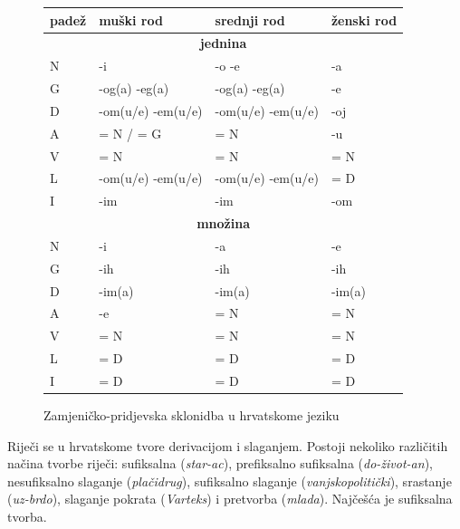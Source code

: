 \begin{multicols}{2}
\begin{figure}[htb]
\centering
    \begin{tabular}{|l|l|l|l|}
        \hline
        \textbf{padež} & \textbf{muški rod}         & \textbf{srednji rod}        & \textbf{ženski rod} \\ \hline
		\multicolumn{4}{|c|}{\textbf{jednina}} \\ \hline
        N     & -i                & -o -e             & -a          \\ 
        G     & -og(a) -eg(a)     & -og(a) -eg(a)     & -e          \\ 
        D     & -om(u/e) -em(u/e) & -om(u/e) -em(u/e) & -oj         \\ 
        A     & = N / = G         & = N               & -u          \\ 
        V     & = N               & = N               & = N         \\ 
        L     & -om(u/e) -em(u/e) & -om(u/e) -em(u/e) & = D         \\ 
        I     & -im               & -im               & -om         \\ \hline
		\multicolumn{4}{|c|}{\textbf{množina}} \\ \hline
		N     & -i        & -a         & -e          \\ 
        G     & -ih       & -ih        & -ih         \\ 
        D     & -im(a)    & -im(a)     & -im(a)      \\ 
        A     & -e        & = N        & = N         \\ 
        V     & = N       & = N        & = N         \\ 
        L     & = D       & = D        & = D         \\ 
        I     & = D       & = D        & = D         \\
        \hline
   \end{tabular}
  \caption{Zamjeničko-pridjevska sklonidba u hrvatskome jeziku}
  \label{fig:zamjenicka}
\end{figure}

Riječi se u hrvatskome tvore derivacijom i slaganjem. Postoji nekoliko različitih načina tvorbe riječi: sufiksalna (\emph{star-ac}), prefiksalno sufiksalna (\emph{do-život-an}), nesufiksalno slaganje (\emph{plačidrug}), sufiksalno slaganje (\emph{vanjskopolitički}), srastanje (\emph{uz-brdo}), slaganje pokrata (\emph{Varteks}) i pretvorba (\emph{mlada}). Najčešća je sufiksalna tvorba.



\end{multicols}
